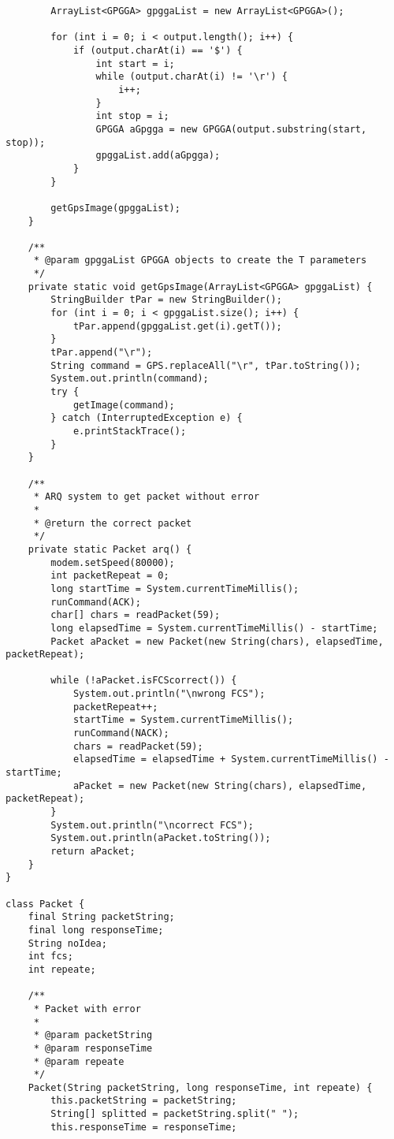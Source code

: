 \documentclass{article}
\begin{document}
\begin{verbatim}
        ArrayList<GPGGA> gpggaList = new ArrayList<GPGGA>();

        for (int i = 0; i < output.length(); i++) {
            if (output.charAt(i) == '$') {
                int start = i;
                while (output.charAt(i) != '\r') {
                    i++;
                }
                int stop = i;
                GPGGA aGpgga = new GPGGA(output.substring(start, stop));
                gpggaList.add(aGpgga);
            }
        }

        getGpsImage(gpggaList);
    }

    /**
     * @param gpggaList GPGGA objects to create the T parameters
     */
    private static void getGpsImage(ArrayList<GPGGA> gpggaList) {
        StringBuilder tPar = new StringBuilder();
        for (int i = 0; i < gpggaList.size(); i++) {
            tPar.append(gpggaList.get(i).getT());
        }
        tPar.append("\r");
        String command = GPS.replaceAll("\r", tPar.toString());
        System.out.println(command);
        try {
            getImage(command);
        } catch (InterruptedException e) {
            e.printStackTrace();
        }
    }

    /**
     * ARQ system to get packet without error
     *
     * @return the correct packet
     */
    private static Packet arq() {
        modem.setSpeed(80000);
        int packetRepeat = 0;
        long startTime = System.currentTimeMillis();
        runCommand(ACK);
        char[] chars = readPacket(59);
        long elapsedTime = System.currentTimeMillis() - startTime;
        Packet aPacket = new Packet(new String(chars), elapsedTime, packetRepeat);

        while (!aPacket.isFCScorrect()) {
            System.out.println("\nwrong FCS");
            packetRepeat++;
            startTime = System.currentTimeMillis();
            runCommand(NACK);
            chars = readPacket(59);
            elapsedTime = elapsedTime + System.currentTimeMillis() - startTime;
            aPacket = new Packet(new String(chars), elapsedTime, packetRepeat);
        }
        System.out.println("\ncorrect FCS");
        System.out.println(aPacket.toString());
        return aPacket;
    }
}

class Packet {
    final String packetString;
    final long responseTime;
    String noIdea;
    int fcs;
    int repeate;

    /**
     * Packet with error
     *
     * @param packetString
     * @param responseTime
     * @param repeate
     */
    Packet(String packetString, long responseTime, int repeate) {
        this.packetString = packetString;
        String[] splitted = packetString.split(" ");
        this.responseTime = responseTime;


\end{verbatim}
\end{document}
